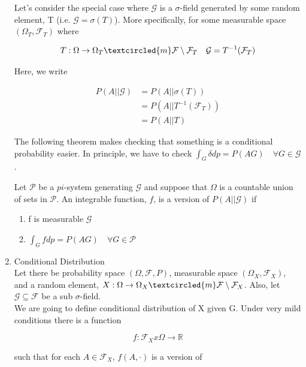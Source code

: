 \documentclass[11pt,fleqn]{book} %
\begin{document}
\begin{enumerate}
		Let's consider the special case where $\mathcal{G}$ is a $\sigma$-field generated by some random element, T (i.e. $\mathcal{G} = \sigma(T)$). More specifically, for some measurable space $(\Omega_T, \mathcal{F}_T)$ where 


				$$T: \Omega \rightarrow \Omega_T \textcircled{m} \mathcal{F}\setminus\mathcal{F}_T \quad \mathcal{G} = T^{-1}(\mathcal{F}_T)$$

		Here, we write

		\begin{align*}
			P(A || \mathcal{G}) &= P(A || \sigma(T))\\
				&=P(A|| T^{-1}(\mathcal{F}_T))\\
				&= P(A || T)
		\end{align*}

		The following theorem makes checking that something is a conditional probability easier. In principle, we have to check $\int_G \delta dp = P(AG) \quad \forall G\in\mathcal{G}$. 

		\begin{theorem}[33.1 in Billingsly]
			Let $\mathcal{P}$ be a $pi$-system generating $\mathcal{G}$ and suppose that $\Omega$ is a countable union of sets in $\mathcal{P}$. An integrable function, $f$, is a version of $P(A || \mathcal{G})$ if 

				\begin{enumerate}
					\item f is measurable $\mathcal{G}$
					\item $\int_G f dp = P(AG) \quad \forall G \in \mathcal{P}$ 
				\end{enumerate}
		\end{theorem}

	\item Conditional Distribution\\

	Let there be probability space $(\Omega, \mathcal{F}, P)$, measurable space $(\Omega_X, \mathcal{F}_X)$, and a random element, $X:\Omega \rightarrow \Omega_X \textcircled{m} \mathcal{F}\setminus\mathcal{F}_X$. Also, let $\mathcal{G} \subseteq \mathcal{F}$ be a sub $\sigma$-field. \\

	We are going to define conditional distribution of X given G. Under very mild conditions there is a function

			$$f: \mathcal{F}_X x \Omega \rightarrow \mathbb{R} $$

	such that for each $A \in \mathcal{F}_X$, $f(A, \cdot)$ is a version of 


\end{enumerate}
\end{document}
